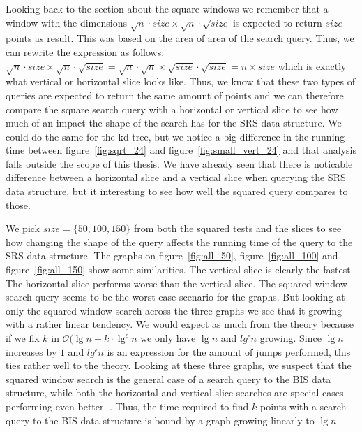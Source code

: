 Looking back to the section about the square windows we remember that a window with the dimensions $\sqrt{n}\cdot{size} \times \sqrt{n}\cdot\sqrt{size}$ is expected to return $size$ points as result. This was based on the area of area of the search query. Thus, we can rewrite the expression as follows: $\sqrt{n}\cdot{size} \times \sqrt{n}\cdot\sqrt{size} = \sqrt{n}\cdot\sqrt{n} \times \sqrt{size}\cdot\sqrt{size} = n \times size$ which is exactly what vertical or horizontal slice looks like. Thus, we know that these two types of queries are expected to return the same amount of points and we can therefore compare the square search query with a horizontal or vertical slice to see how much of an impact the shape of the search has for the SRS data structure. We could do the same for the kd-tree, but we notice a big difference in the running time between figure~\ref{fig:sqrt_24} and figure~\ref{fig:small_vert_24} and that analysis falls outside the scope of this thesis. We have already seen that there is noticable difference between a horizontal slice and a vertical slice when querying the SRS data structure, but it interesting to see how well the squared query compares to those. 


We pick $size=\{50,100,150\}$ from both the squared tests and the slices to see how changing the shape of the query affects the running time of the query to the SRS data structure. The graphs on figure~\ref{fig:all_50}, figure~\ref{fig:all_100} and figure~\ref{fig:all_150} show some similarities. The vertical slice is clearly the fastest. The horizontal slice performs worse than the vertical slice. The squared window search query seems to be the worst-case scenario for the graphs. But looking at only the squared window search across the three graphs we see that it growing with a rather linear tendency. We would expect as much from the theory because if we fix $k$ in $\mathcal{O}(\lg n + k\cdot \lg^\epsilon n$ we only have $\lg n$ and $lg^\epsilon n$ growing. Since $\lg n$ increases by $1$ and $lg^\epsilon n$ is an expression for the amount of jumps performed, this ties rather well to the theory. Looking at these three graphs, we suspect that the squared window search is the general case of a search query to the BIS data structure, while both the horizontal and vertical slice searches are special cases performing even better. . Thus, the time required to find $k$ points with a search query to the BIS data structure is bound by a graph growing linearly to $\lg n$. 

